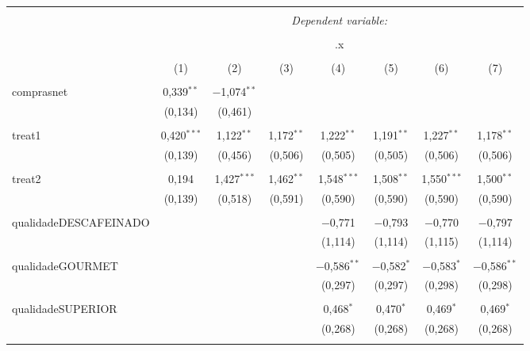 
\begin{table}[!htbp] \centering 
  \caption{} 
  \label{} 
\begin{tabular}{@{\extracolsep{5pt}}lccccccc} 
\\[-1.8ex]\hline 
\hline \\[-1.8ex] 
 & \multicolumn{7}{c}{\textit{Dependent variable:}} \\ 
\cline{2-8} 
\\[-1.8ex] & \multicolumn{7}{c}{.x} \\ 
\\[-1.8ex] & (1) & (2) & (3) & (4) & (5) & (6) & (7)\\ 
\hline \\[-1.8ex] 
 comprasnet & 0,339$^{**}$ & $-$1,074$^{**}$ &  &  &  &  &  \\ 
  & (0,134) & (0,461) &  &  &  &  &  \\ 
  & & & & & & & \\ 
 treat1 & 0,420$^{***}$ & 1,122$^{**}$ & 1,172$^{**}$ & 1,222$^{**}$ & 1,191$^{**}$ & 1,227$^{**}$ & 1,178$^{**}$ \\ 
  & (0,139) & (0,456) & (0,506) & (0,505) & (0,505) & (0,506) & (0,506) \\ 
  & & & & & & & \\ 
 treat2 & 0,194 & 1,427$^{***}$ & 1,462$^{**}$ & 1,548$^{***}$ & 1,508$^{**}$ & 1,550$^{***}$ & 1,500$^{**}$ \\ 
  & (0,139) & (0,518) & (0,591) & (0,590) & (0,590) & (0,590) & (0,590) \\ 
  & & & & & & & \\ 
 qualidadeDESCAFEINADO &  &  &  & $-$0,771 & $-$0,793 & $-$0,770 & $-$0,797 \\ 
  &  &  &  & (1,114) & (1,114) & (1,115) & (1,114) \\ 
  & & & & & & & \\ 
 qualidadeGOURMET &  &  &  & $-$0,586$^{**}$ & $-$0,582$^{*}$ & $-$0,583$^{*}$ & $-$0,586$^{**}$ \\ 
  &  &  &  & (0,297) & (0,297) & (0,298) & (0,298) \\ 
  & & & & & & & \\ 
 qualidadeSUPERIOR &  &  &  & 0,468$^{*}$ & 0,470$^{*}$ & 0,469$^{*}$ & 0,469$^{*}$ \\ 
  &  &  &  & (0,268) & (0,268) & (0,268) & (0,268) \\ 
  & & & & & & & \\ 

\end{tabular}
\end{table}
